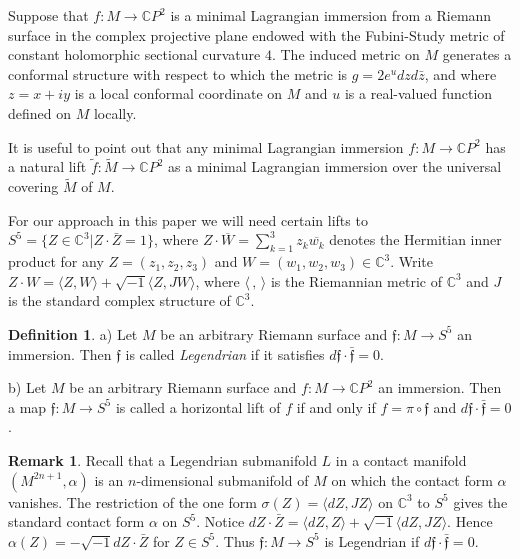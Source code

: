 \documentclass[a4paper,11pt]{amsart}
\theoremstyle{definition}
\newtheorem{definition}{Definition}
\newtheorem{remark}{Remark}
\numberwithin{equation}{section}
\newcommand{\C}{\mathbb{C}}
\newcommand{\f}{\mathfrak{f}}
\begin{document}
Suppose that $f:M \rightarrow \C P^2$ is a minimal Lagrangian immersion from a 
Riemann surface
in the complex projective plane endowed with the Fubini-Study metric of constant holomorphic sectional curvature $4$.
The induced metric on $M$ generates a conformal structure with
respect to which the metric is $g=2e^{u} dzd{\bar z}$, and where $z=x+iy$ is a local
conformal coordinate on $M$ and $u$ is a real-valued function defined on $M$ locally.

It is useful to point out that any  minimal Lagrangian immersion $f:M\rightarrow {\mathbb C}P^2$ 
has a natural lift  $\tilde{f}: \tilde{M} \rightarrow {\mathbb C}P^2$ as a  minimal Lagrangian immersion over the universal covering $\tilde{M}$ of $M$.
 
For our approach in this paper we will need certain lifts to  $S^5 =\{Z\in \mathbb{C}^3 | Z\cdot \bar{Z}=1\}$, 
where $Z\cdot \overline{W}=\sum_{k=1}^{3} z_{k} \overline{w_{k}}$
denotes the Hermitian inner product for any $Z=(z_1,z_2,z_3)$ and $W=(w_1,w_2,w_3)\in \mathbb{C}^3$. Write $Z\cdot W=\langle Z, W\rangle + \sqrt{-1}\langle Z, JW\rangle$, where $\langle \,,\, \rangle$ is the Riemannian metric of $\C^3$ and $J$ is the standard complex structure of $\C^3$.


\begin{definition}
a) Let $M$ be an arbitrary Riemann surface and  $\f: M \rightarrow S^5$ an immersion.
Then $\f$ is called  
\emph{Legendrian}  if it satisfies 
$ d\f\cdot  \bar{\f}=0$.



b) Let $M$ be an arbitrary Riemann surface and  $f: M \rightarrow  {\mathbb C}P^2$  an immersion.
Then a map $\f: M \rightarrow S^5$ is called 
a horizontal lift of $f$ if and only if 
$f = \pi \circ \f$ and 
$ d\f\cdot  \bar{\f}=0$.
\end{definition}

\begin{remark} 
Recall that a Legendrian submanifold $L$ in a contact manifold $(M^{2n+1}, \alpha)$ is an $n$-dimensional submanifold of $M$ on which the contact form $\alpha$ vanishes.  The restriction of the one form $\sigma(Z)=\langle dZ, JZ\rangle$ on $\mathbb{C}^3$  to $S^5$ gives the standard contact form $\alpha$ on $S^5$. Notice
$dZ\cdot \bar{Z}=\langle dZ, Z\rangle+\sqrt{-1} \langle dZ, JZ\rangle.$ 
Hence $\alpha(Z)=-\sqrt{-1} dZ\cdot \bar{Z}$ for $Z\in S^5$.
Thus $\f: M \rightarrow S^5$ is Legendrian if $d\f\cdot \bar{\f}=0$.
\end{remark}
\end{document}
